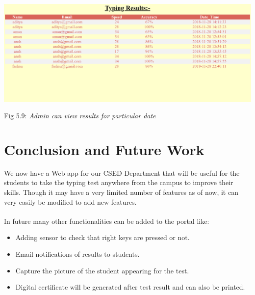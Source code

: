 \documentclass{mnnit}
\begin{document}
\includegraphics[width=\textwidth]{images/10_img.PNG}
\begin{center}
Fig 5.9: \emph{Admin can view results for particular date}\\
\end{center}
\user
\chapter{Conclusion and Future Work}
We now have a Web-app for our CSED Department that will be useful for the students to take the typing test anywhere from the campus to improve their skills. Though it may have a very limited number of features as of now, it can very easily be modified to add new features.\\\\
In future many other functionalities can be added to the portal like\cite{Refworks=1249}:
\begin{itemize}
    \item Adding sensor to check that right keys are pressed or not.
    \item Email notifications of results to students.
    \item Capture the picture of the student appearing for the test.
    \item Digital certificate will be generated after test result and can also be printed.
\end{itemize}







\end{document}
